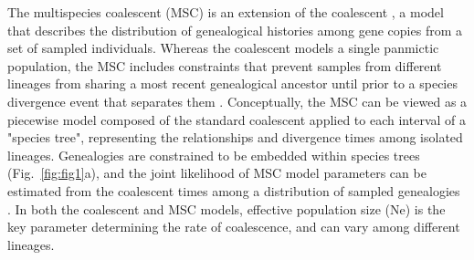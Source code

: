\documentclass[11pt]{article}
\begin{document}

The multispecies coalescent (MSC) is an extension of the coalescent 
\citep{kingman1982coalescent}, a model that describes the distribution of genealogical 
histories among gene copies from a set of sampled individuals. Whereas the 
coalescent models a single panmictic population, the MSC includes constraints that prevent 
samples from different lineages from sharing a most recent genealogical ancestor until prior
to a species divergence event that separates them \citep{maddison1997gene,maddison2006inferring}. 
Conceptually, the MSC can be viewed as a piecewise model composed of the standard
coalescent applied to each interval of a "species tree", representing the relationships
and divergence times among isolated lineages. Genealogies are constrained to be
embedded within species trees (Fig.~\ref{fig:fig1}a), and the joint likelihood of 
MSC model parameters can be estimated from the coalescent times among a 
distribution of sampled genealogies
\citep{rannala2003bayes,degnan2009gene}. In both the coalescent
and MSC models, effective population size (Ne) is the key parameter determining 
the rate of coalescence, and can vary among different lineages. 

\end{document}
